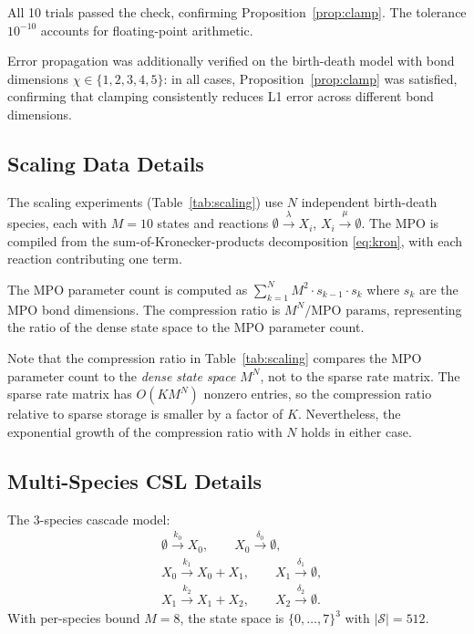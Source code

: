 \documentclass[11pt]{article}
\newcommand{\calS}{\mathcal{S}}
\begin{document}
All 10 trials passed the check, confirming
Proposition~\ref{prop:clamp}.
The tolerance $10^{-10}$ accounts for floating-point arithmetic.

Error propagation was additionally verified on the birth-death model
with bond dimensions $\chi \in \{1, 2, 3, 4, 5\}$: in all cases,
Proposition~\ref{prop:clamp} was satisfied, confirming that clamping
consistently reduces L1 error across different bond dimensions.

\subsection{Scaling Data Details}

The scaling experiments (Table~\ref{tab:scaling}) use $N$ independent
birth-death species, each with $M=10$ states and reactions
$\emptyset \xrightarrow{\lambda} X_i$, $X_i \xrightarrow{\mu} \emptyset$.
The MPO is compiled from the sum-of-Kronecker-products decomposition
\eqref{eq:kron}, with each reaction contributing one term.

The MPO parameter count is computed as
$\sum_{k=1}^{N} M^2 \cdot s_{k-1} \cdot s_k$ where $s_k$ are the
MPO bond dimensions.
The compression ratio is $M^N / \text{MPO params}$, representing
the ratio of the dense state space to the MPO parameter count.

Note that the compression ratio in Table~\ref{tab:scaling} compares
the MPO parameter count to the \emph{dense state space} $M^N$, not
to the sparse rate matrix.
The sparse rate matrix has $O(KM^N)$ nonzero entries, so the
compression ratio relative to sparse storage is smaller by a factor
of $K$.
Nevertheless, the exponential growth of the compression ratio with
$N$ holds in either case.

\subsection{Multi-Species CSL Details}

The 3-species cascade model:
\begin{align}
  &\emptyset \xrightarrow{k_0} X_0, \qquad
  X_0 \xrightarrow{\delta_0} \emptyset, \nonumber\\
  &X_0 \xrightarrow{k_1} X_0 + X_1, \qquad
  X_1 \xrightarrow{\delta_1} \emptyset, \nonumber\\
  &X_1 \xrightarrow{k_2} X_1 + X_2, \qquad
  X_2 \xrightarrow{\delta_2} \emptyset. \nonumber
\end{align}
With per-species bound $M=8$, the state space is
$\{0,\ldots,7\}^3$ with $|\calS| = 512$.
\end{document}
